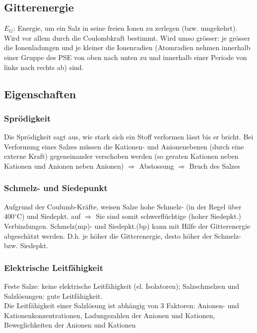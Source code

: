 \subsection{Gitterenergie}
$E_G$: Energie, um ein Salz in seine freien Ionen zu zerlegen (bzw. umgekehrt). Wird vor allem durch die Coulombkraft bestimmt. Wird umso grösser: je grösser die Ionenladungen und je kleiner die Ionenradien (Atomradien nehmen innerhalb einer Gruppe des PSE von oben nach unten zu und innerhalb einer Periode von links nach rechts ab) sind.

\subsection{Eigenschaften}
\subsubsection{Sprödigkeit}
Die Sprödigkeit sagt aus, wie stark sich ein Stoff verformen lässt bis er bricht. Bei Verformung eines Salzes müssen die Kationen- und Anionenebenen (durch eine externe Kraft) gegeneinander verschoben werden (so geraten Kationen neben Kationen und Anionen neben Anionen) $\Rightarrow$ Abstossung $\Rightarrow$ Bruch des Salzes

\subsubsection{Schmelz- und Siedepunkt}
Aufgrund der Coulumb-Kräfte, weisen Salze hohe Schmelz- (in der Regel über 400$^\circ$C) und Siedepkt. auf $\Rightarrow$ Sie sind somit schwerflüchtige (hoher Siedepkt.) Verbindungen. Schmelz(mp)- und Siedepkt.(bp) kann mit Hilfe der Gitterenergie abgeschätzt werden. D.h. je höher die Gitterenergie, desto höher der Schmelz- bzw. Siedepkt. 

\subsubsection{Elektrische Leitfähigkeit}
Feste Salze: keine elektrische Leitfähigkeit (el. Isolatoren); Salzschmelzen und Salzlösungen: gute Leitfähigkeit.\\
Die Leitfähigkeit einer Salzlösung ist abhängig von 3 Faktoren: Anionen- und Kationenkonzentrationen, Ladungszahlen der Anionen und Kationen, Beweglichkeiten der Anionen und Kationen

